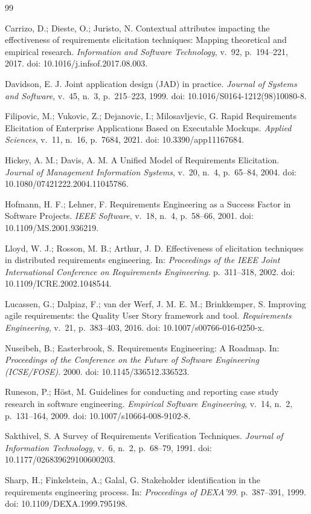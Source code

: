 \documentclass[12pt]{article}
\begin{document}
\begin{thebibliography}{99}

Carrizo, D.; Dieste, O.; Juristo, N. Contextual attributes impacting the effectiveness of requirements elicitation techniques: Mapping theoretical and empirical research. \textit{Information and Software Technology}, v.~92, p.~194--221, 2017. doi: 10.1016/j.infsof.2017.08.003.

Davidson, E. J. Joint application design (JAD) in practice. \textit{Journal of Systems and Software}, v.~45, n.~3, p.~215--223, 1999. doi: 10.1016/S0164-1212(98)10080-8.

Filipovic, M.; Vukovic, Z.; Dejanovic, I.; Milosavljevic, G. Rapid Requirements Elicitation of Enterprise Applications Based on Executable Mockups. \textit{Applied Sciences}, v.~11, n.~16, p.~7684, 2021. doi: 10.3390/app11167684.

Hickey, A. M.; Davis, A. M. A Unified Model of Requirements Elicitation. \textit{Journal of Management Information Systems}, v.~20, n.~4, p.~65--84, 2004. doi: 10.1080/07421222.2004.11045786.

Hofmann, H. F.; Lehner, F. Requirements Engineering as a Success Factor in Software Projects. \textit{IEEE Software}, v.~18, n.~4, p.~58--66, 2001. doi: 10.1109/MS.2001.936219.

Lloyd, W. J.; Rosson, M. B.; Arthur, J. D. Effectiveness of elicitation techniques in distributed requirements engineering. In: \textit{Proceedings of the IEEE Joint International Conference on Requirements Engineering}. p.~311--318, 2002. doi: 10.1109/ICRE.2002.1048544.

Lucassen, G.; Dalpiaz, F.; van der Werf, J. M. E. M.; Brinkkemper, S. Improving agile requirements: the Quality User Story framework and tool. \textit{Requirements Engineering}, v.~21, p.~383--403, 2016. doi: 10.1007/s00766-016-0250-x.

Nuseibeh, B.; Easterbrook, S. Requirements Engineering: A Roadmap. In: \textit{Proceedings of the Conference on the Future of Software Engineering (ICSE/FOSE)}. 2000. doi: 10.1145/336512.336523.

Runeson, P.; H{\"o}st, M. Guidelines for conducting and reporting case study research in software engineering. \textit{Empirical Software Engineering}, v.~14, n.~2, p.~131--164, 2009. doi: 10.1007/s10664-008-9102-8.

Sakthivel, S. A Survey of Requirements Verification Techniques. \textit{Journal of Information Technology}, v.~6, n.~2, p.~68--79, 1991. doi: 10.1177/026839629100600203.

Sharp, H.; Finkelstein, A.; Galal, G. Stakeholder identification in the requirements engineering process. In: \textit{Proceedings of DEXA'99}. p.~387--391, 1999. doi: 10.1109/DEXA.1999.795198.

\end{thebibliography}
\end{document}
